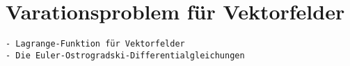 %
%
%
\section{Varationsproblem für Vektorfelder
\label{buch:felder:section:vektorfelder}}

\begin{verbatim}
- Lagrange-Funktion für Vektorfelder
- Die Euler-Ostrogradski-Differentialgleichungen 
\end{verbatim}
